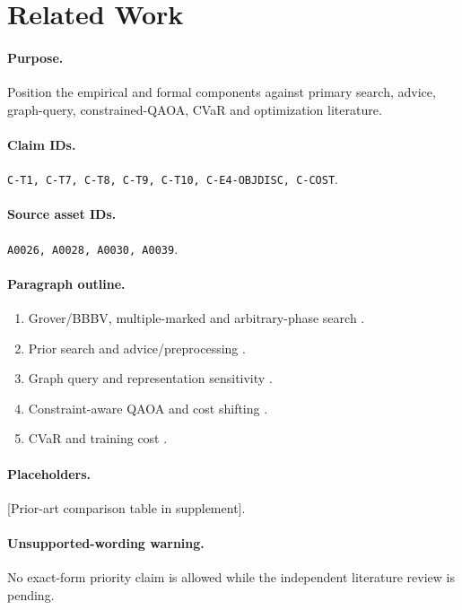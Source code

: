 \section{Related Work}

\paragraph{Purpose.}
Position the empirical and formal components against primary search, advice,
graph-query, constrained-QAOA, CVaR and optimization literature.

\paragraph{Claim IDs.}
\texttt{C-T1, C-T7, C-T8, C-T9, C-T10, C-E4-OBJDISC, C-COST}.

\paragraph{Source asset IDs.}
\texttt{A0026, A0028, A0030, A0039}.

\paragraph{Paragraph outline.}
\begin{enumerate}
  \item Grover/BBBV, multiple-marked and arbitrary-phase search
  \cite{bennett1997strengths,boyer1998tight,zalka1999optimal,hoyer2000arbitrary}.
  \item Prior search and advice/preprocessing
  \cite{montanaro2010advice,nayebi2015inverting,chung2020advice}.
  \item Graph query and representation sensitivity
  \cite{durr2006graph,galperin1983succinct}.
  \item Constraint-aware QAOA and cost shifting
  \cite{hadfield2019alternating,bartschi2020grover,egger2021warm}.
  \item CVaR and training cost \cite{barkoutsos2020cvar,bittel2021training}.
\end{enumerate}

\paragraph{Placeholders.}
[Prior-art comparison table in supplement].

\paragraph{Unsupported-wording warning.}
No exact-form priority claim is allowed while the independent literature review
is pending.
